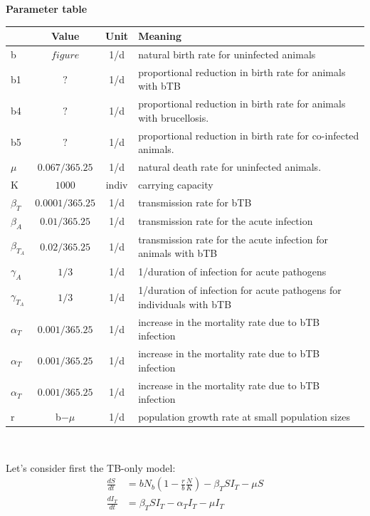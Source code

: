 \documentclass[letterpaper,12pt]{article}
\begin{document}
\textbf{Parameter table}
\begin{table}[hb]
\newcommand{\head}[1]{\textnormal{\textbf{#1}}}
\small
\begin{tabular}{lccp{12cm}}
\hline
\head{ } & \head{Value} & \head{Unit} & \head{Meaning}\\
\hline
b & $ figure $ & 1/d &  natural birth rate for uninfected animals \\
b1 & $?$ & 1/d & proportional reduction in birth rate for animals with bTB \\
b4 & $? $ & 1/d &proportional reduction in birth rate for animals with brucellosis.  \\
b5& $? $ & 1/d & proportional reduction in birth rate for co-infected animals.  \\

$\mu$& $0.067/365.25$& 1/d& natural death rate for uninfected animals.\\
K& $1000$& indiv & carrying capacity \\
 $\beta_T$& $0.0001/365.25$& 1/d& transmission rate for bTB \\
 $\beta_A$& $0.01/365.25$& 1/d& transmission rate for the acute infection \\
 $\beta_{T_A}$& $0.02/365.25$& 1/d& transmission rate for the acute infection for animals with bTB \\
 $\gamma_A$& $1/3$& 1/d& 1/duration of infection for acute pathogens \\
 $\gamma_{T_A}$& $1/3$& 1/d& 1/duration of infection for acute pathogens for individuals with bTB \\
 $\alpha_T$& $0.001/365.25$& 1/d& increase in the mortality rate due to bTB infection \\
  $\alpha_T$& $0.001/365.25$& 1/d& increase in the mortality rate due to bTB infection \\ 
 $\alpha_T$& $0.001/365.25$ & 1/d& increase in the mortality rate due to bTB infection \\
 r & b$-\mu$ & 1/d & population growth rate at small population sizes \\
\hline 
\end{tabular}
\end{table}
\\
\pagebreak






Let's consider first the TB-only model:
\begin{align}
\frac{dS}{dt}&=b N_b\left(1-\frac{r}{b}\frac{N}{K}\right) -\beta_T S I_T - \mu S\\
\frac{dI_T}{dt}&=\beta_T S I_T - \alpha_T I_T - \mu I_T
\end{align}
\end{document}
